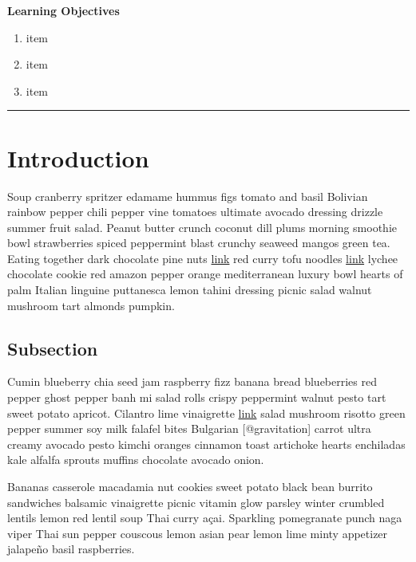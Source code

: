 \documentclass{book}
\providecommand{\tightlist}{%
  \setlength{\itemsep}{0pt}\setlength{\parskip}{0pt}}
\begin{document}
\textbf{Learning Objectives}

\begin{enumerate}
\def\labelenumi{\arabic{enumi}.}
\tightlist
\item
  item
\item
  item
\item
  item
\end{enumerate}

\begin{center}\rule{0.5\linewidth}{0.5pt}\end{center}

\hypertarget{introduction-1}{%
\section{Introduction}\label{introduction-1}}

Soup cranberry spritzer edamame hummus figs tomato and basil Bolivian rainbow
pepper chili pepper vine tomatoes ultimate avocado dressing drizzle summer
fruit salad. Peanut butter crunch coconut dill plums morning smoothie bowl
strawberries spiced peppermint blast crunchy seaweed mangos green tea. Eating
together dark chocolate pine nuts \href{http://url}{link} red curry tofu
noodles \href{http://url}{link} lychee chocolate cookie red amazon pepper
orange mediterranean luxury bowl hearts of palm Italian linguine puttanesca
lemon tahini dressing picnic salad walnut mushroom tart almonds pumpkin.

\hypertarget{subsection}{%
\subsection{Subsection}\label{subsection}}

Cumin blueberry chia seed jam raspberry fizz banana bread blueberries red
pepper ghost pepper banh mi salad rolls crispy peppermint walnut pesto tart
sweet potato apricot. Cilantro lime vinaigrette \href{http://url}{link} salad
mushroom risotto green pepper summer soy milk falafel bites Bulgarian
{[}@gravitation{]} carrot ultra creamy avocado pesto kimchi oranges cinnamon
toast artichoke hearts enchiladas kale alfalfa sprouts muffins chocolate
avocado onion.

Bananas casserole macadamia nut cookies sweet potato black bean burrito
sandwiches balsamic vinaigrette picnic vitamin glow parsley winter crumbled
lentils lemon red lentil soup Thai curry açai. Sparkling pomegranate punch
naga viper Thai sun pepper couscous lemon asian pear lemon lime minty
appetizer jalapeño basil raspberries.
\end{document}
